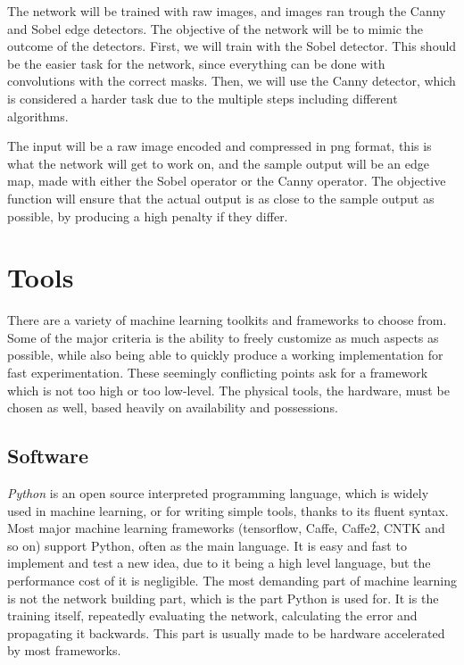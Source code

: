 \documentclass[12pt]{report}
\begin{document}
The network will be trained with raw images, and images ran trough the Canny and Sobel edge detectors. The objective of the network will be to mimic the outcome of the detectors. First, we will train with the Sobel detector. This should be the easier task for the network, since everything can be done with convolutions with the correct masks. Then, we will use the Canny detector, which is considered a harder task due to the multiple steps including different algorithms.

The input will be a raw image encoded and compressed in png format, this is what the network will get to work on, and the sample output will be an edge map, made with either the Sobel operator or the Canny operator. The objective function will ensure that the actual output is as close to the sample output as possible, by producing a high penalty if they differ.
\section{Tools}
There are a variety of machine learning toolkits and frameworks to choose from. Some of the major criteria is the ability to freely customize as much aspects as possible, while also being able to quickly produce a working implementation for fast experimentation. These seemingly conflicting points ask for a framework which is not too high or too low-level. The physical tools, the hardware, must be chosen as well, based heavily on availability and possessions.
\subsection{Software}
\textit{Python} is an open source interpreted programming language, which is widely used in machine learning, or for writing simple tools, thanks to its fluent syntax. Most major machine learning frameworks (tensorflow, Caffe, Caffe2, CNTK and so on) support Python, often as the main language. It is easy and fast to implement and test a new idea, due to it being a high level language, but the performance cost of it is negligible. The most demanding part of machine learning is not the network building part, which is the part Python is used for. It is the training itself, repeatedly evaluating the network, calculating the error and propagating it backwards. This part is usually made to be hardware accelerated by most frameworks.
\end{document}
